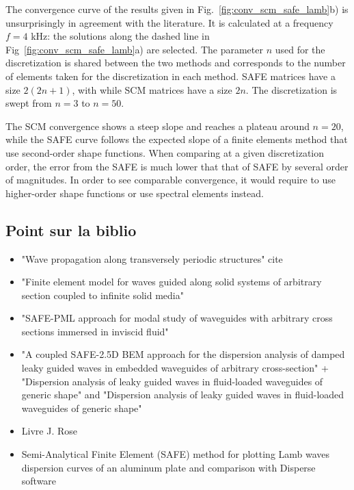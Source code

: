 The convergence curve of the results given in Fig.~\ref{fig:conv_scm_safe_lamb}b) is unsurprisingly in agreement with the literature. It is calculated at a frequency $f=4$ kHz: the solutions along the dashed line in Fig~\ref{fig:conv_scm_safe_lamb}a) are selected. The parameter $n$ used for the discretization is shared between the two methods and corresponds to the number of elements taken for the discretization in each method. SAFE matrices have a size $2(2n+ 1)$, with while SCM matrices have a size $2n$. The discretization is swept from $n=3$ to $n=50$.

The SCM convergence shows a steep slope and reaches a plateau around $n = 20$, while the SAFE curve follows the expected slope of a finite elements method that use second-order shape functions. When comparing at a given discretization order, the error from the SAFE is much lower that that of SAFE by several order of magnitudes. In order to see comparable convergence, it would require to use higher-order shape functions or use spectral elements instead.


\subsection{Point sur la biblio}
\begin{itemize}
    \item "Wave propagation along transversely periodic structures" cite \cite{predoi2007} 
    \item "Finite element model for waves guided along solid systems of arbitrary section coupled to infinite solid media" \cite{castaings2008} 
    \item "SAFE-PML approach for modal study of waveguides with arbitrary cross sections immersed in inviscid fluid" \cite{zuo2017} 
    \item "A coupled SAFE-2.5D BEM approach for the dispersion analysis of damped leaky guided waves in embedded waveguides of arbitrary cross-section" \cite{mazzotti2013} + "Dispersion analysis of leaky guided waves in fluid-loaded waveguides of generic shape" and \cite{mazzotti2014} "Dispersion analysis of leaky guided waves in fluid-loaded waveguides of generic shape"
    \item Livre J. Rose \cite{rose2014}
    \item Semi-Analytical Finite Element (SAFE) method for plotting Lamb waves dispersion curves of an aluminum plate and comparison with Disperse software \cite{yacoubi2022}
\end{itemize}